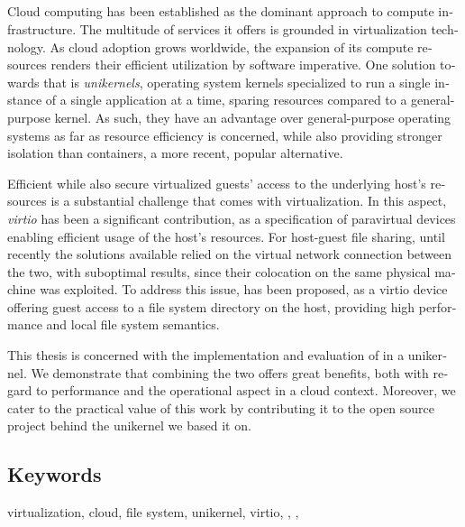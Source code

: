 \begin{otherlanguage}{english}
	\chapter*{\abstractname}
	Cloud computing has been established as the dominant approach to compute
	infrastructure. The multitude of services it offers is grounded in
	virtualization technology. As cloud adoption grows worldwide, the expansion
	of its compute resources renders their efficient utilization by software
	imperative. One solution towards that is \emph{unikernels}, operating system
	kernels specialized to run a single instance of a single application at a
	time, sparing resources compared to a general-purpose kernel. As such,
	they have an advantage over general-purpose operating systems as far as
	resource efficiency is concerned, while also providing stronger isolation
	than containers, a more recent, popular alternative.

	Efficient while also secure virtualized guests' access to the underlying
	host's resources is a substantial challenge that comes with virtualization.
	In this aspect, \emph{virtio} has been a significant contribution, as a
	specification of paravirtual devices enabling efficient usage of the host's
	resources. For host-guest file sharing, until recently the solutions
	available relied on the virtual network connection between the two, with
	suboptimal results, since their colocation on the same physical machine was
	exploited. To address this issue, \emph{\viofs{}} has been proposed, as a
	virtio device offering guest access to a file system directory on the host,
	providing high performance and local file system semantics.

	This thesis is concerned with the implementation and evaluation of \viofs{}
	in a unikernel. We demonstrate that combining the two offers great benefits,
	both with regard to performance and the operational aspect in a cloud
	context. Moreover, we cater to the practical value of this work by
	contributing it to the open source project behind the unikernel we based it
	on.

	\section*{Keywords}
	\noindent
	virtualization, cloud, file system, unikernel, virtio, \osv{}, \viofs{},
	\qemu{}
\end{otherlanguage}
